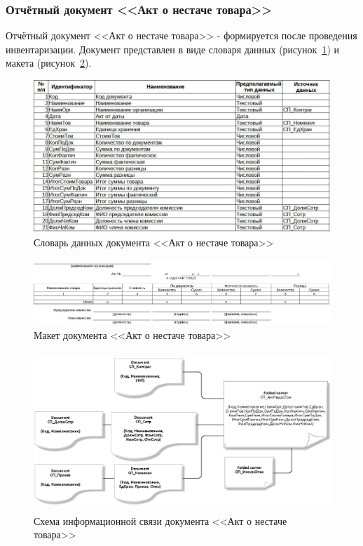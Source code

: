 \newpage
\subsubsection{Отчётный документ <<Акт о нестаче товара>>}

Отчётный документ <<Акт о нестаче товара>>
- формируется после проведения инвентаризации.
Документ представлен в виде словаря данных (рисунок~\ref{fig:OT_AktNedosTov_tipi})
и макета (рисунок~\ref{fig:OT_AktNedosTov_maket}).

\begin{figure}[!h]
    \centering
    \includegraphics[width=14cm]
        {_docs/ОТ_АктНедосТов_типы.jpg}
    \caption{Словарь данных документа <<Акт о нестаче товара>>}
    \label{fig:OT_AktNedosTov_tipi}
\end{figure}

\begin{figure}[!h]
    \centering
    \includegraphics[width=14cm]
        {_docs/ОТ_АктНедосТов_макет.jpg}
    \caption{Макет документа <<Акт о нестаче товара>>}
    \label{fig:OT_AktNedosTov_maket}
\end{figure}

\begin{figure}[!h]
    \centering
    \includegraphics[height=6cm]
        {_docs/ОТ_АктНедосТов_связи.png}
    \caption{Схема информационной связи документа <<Акт о нестаче товара>>}
    \label{fig:OP_AktNedosTov_svazi}
\end{figure}

